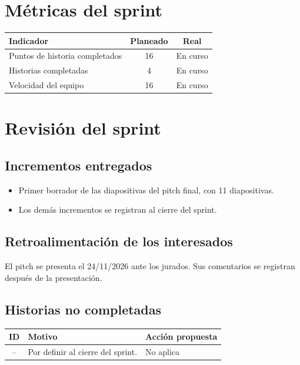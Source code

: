 \documentclass[11pt,a4paper]{article}
\begin{document}
\section{Métricas del sprint}

\begin{tabularx}{\textwidth}{X c c}
  \toprule
  \textbf{Indicador} & \textbf{Planeado} & \textbf{Real} \\
  \midrule
  Puntos de historia completados & 16 & En curso \\
  Historias completadas          & 4 & En curso \\
  Velocidad del equipo           & 16 & En curso \\
  \bottomrule
\end{tabularx}

\section{Revisión del sprint}

\subsection{Incrementos entregados}
\begin{itemize}[leftmargin=1.5em]
  \item {Primer borrador de las diapositivas del pitch final, con 11 diapositivas.}
  \item {Los demás incrementos se registran al cierre del sprint.}
\end{itemize}

\subsection{Retroalimentación de los interesados}
{El pitch se presenta el 24/11/2026 ante los jurados. Sus comentarios se registran después de la presentación.}

\subsection{Historias no completadas}
\begin{tabularx}{\textwidth}{c X X}
  \toprule
  \textbf{ID} & \textbf{Motivo} & \textbf{Acción propuesta} \\
  \midrule
  -- & Por definir al cierre del sprint. & No aplica \\
  \bottomrule
\end{tabularx}
\end{document}
